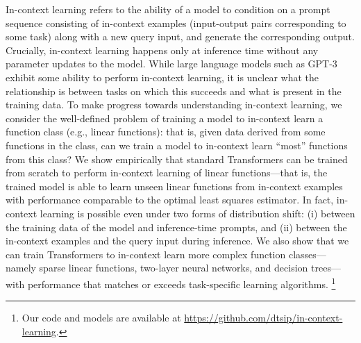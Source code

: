 In-context learning refers to the ability of a model to condition on a prompt sequence consisting of in-context examples (input-output pairs corresponding to some task) along with a new query input, and generate the corresponding output.
Crucially, in-context learning happens only at inference time without any parameter updates to the model. 
While large language models such as GPT-3 exhibit some ability to perform in-context learning, it is unclear what the relationship is between tasks on which this succeeds and what is present in the training data.
To make progress towards understanding in-context learning, we consider the well-defined problem of training a model to in-context learn a function class (e.g., linear functions): that is, given data derived from some functions in the class, can we train a model to in-context learn ``most'' functions from this class?
We show empirically that standard Transformers can be trained from scratch to perform in-context learning of linear functions---that is, the trained model is able to learn unseen linear functions from in-context examples with performance comparable to the optimal least squares estimator.
In fact, in-context learning is possible even under two forms of distribution shift: (i) between the training data of the model and inference-time prompts, and (ii) between the in-context examples and the query input during inference.
We also show that we can train Transformers to in-context learn more complex function classes---namely sparse linear functions, two-layer neural networks, and decision trees---with performance that matches or exceeds 
task-specific learning algorithms.
\footnote{Our code and models are available at \url{https://github.com/dtsip/in-context-learning}.}